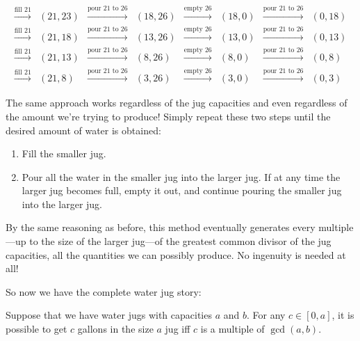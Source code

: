 \[\begin{array}{cccccccc}
\xrightarrow{\text{fill 21}} & (21,23)&
\xrightarrow{\text{pour 21 to 26}} & (18,26)& \xrightarrow{\text{empty
    26}} & (18,0)& \xrightarrow{\text{pour 21 to 26}} &
(0,18)\\
\xrightarrow{\text{fill 21}} & (21,18)&
\xrightarrow{\text{pour 21 to 26}} & (13,26)& \xrightarrow{\text{empty
    26}} & (13,0)& \xrightarrow{\text{pour 21 to 26}} &
(0,13)\\
\xrightarrow{\text{fill 21}} & (21,13)&
\xrightarrow{\text{pour 21 to 26}} & (8,26)& \xrightarrow{\text{empty
    26}} & (8,0)& \xrightarrow{\text{pour 21 to 26}} &
(0,8)\\
\xrightarrow{\text{fill 21}} & (21,8)& \xrightarrow{\text{pour
    21 to 26}} & (3,26)& \xrightarrow{\text{empty 26}} & (3,0)&
\xrightarrow{\text{pour 21 to 26}} & (0,3)
\end{array}
\]

The same approach works regardless of the jug capacities and even
regardless of the amount we're trying to produce!  Simply repeat these
two steps until the desired amount of water is obtained:
\begin{enumerate}
\item Fill the smaller jug.

\item Pour all the water in the smaller jug into the larger jug.  If
  at any time the larger jug becomes full, empty it out, and continue
  pouring the smaller jug into the larger jug.
\end{enumerate}
By the same reasoning as before, this method eventually generates
every multiple---up to the size of the larger jug---of the greatest
common divisor of the jug capacities, all the quantities we
can possibly produce.  No ingenuity is needed at all!

So now we have the complete water jug story:
\begin{theorem}\label{th:waterjugs}
Suppose that we have water jugs with capacities $a$ and $b$.  For any
$c \in [0,a]$, it is possible to get $c$ gallons in the size $a$ jug
iff $c$ is a multiple of $\gcd(a, b)$.
\end{theorem}

